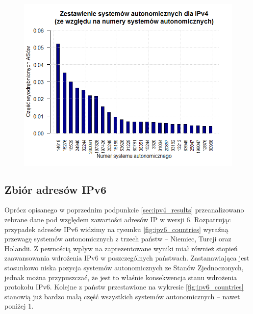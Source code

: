 \begin{figure}[ht]
	\centering
	\includegraphics[width=1.0\textwidth]{image/asn_all}
	\caption{}
	\label{fig:asn_all}
\end{figure}

\subsection{Zbiór adresów IPv6}
Oprócz opisanego w poprzednim podpunkcie \ref{sec:ipv4_results} przeanalizowano zebrane dane pod względem zawartości adresów IP w wersji 6. Rozpatrując przypadek adresów IPv6 widzimy na rysunku \ref{fig:ipv6_countries} wyraźną przewagę systemów autonomicznych z trzech państw -- Niemiec, Turcji oraz Holandii. Z pewnością wpływ na zaprezentowane wyniki miał również stopień zaawansowania wdrożenia IPv6 w poszczególnych państwach. Zastanawiająca jest stosunkowo niska pozycja systemów autonomicznych ze Stanów Zjednoczonych, jednak można przypuszczać, że jest to właśnie konsekwencja stanu wdrożenia protokołu IPv6. Kolejne z państw przestawione na wykresie \ref{fig:ipv6_countries} stanowią już bardzo małą część wszystkich systemów autonomicznych -- nawet poniżej 1\textperthousand.


